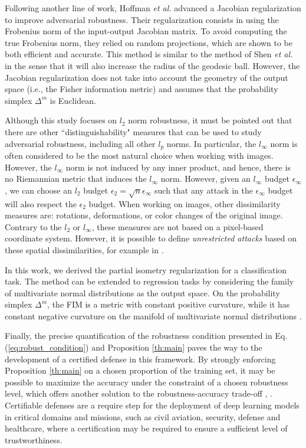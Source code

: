 \documentclass[entropy,article,submit,pdftex,moreauthors]{Definitions/mdpi}
\theoremstyle{plain}
\theoremstyle{definition}
\begin{document}
Following another line of work, Hoffman \emph{et al.} \citep{hoffmanRobustLearningJacobian2019} advanced a Jacobian regularization to improve adversarial robustness. Their regularization consists in using the Frobenius norm of the input-output Jacobian matrix. To avoid computing the true Frobenius norm, they relied on random projections, which are shown to be both efficient and accurate. This method is similar to the method of Shen \emph{et al.} \citep{shenDefendingAdversarialAttacks2019} in the sense that it will also increase the radius of the geodesic ball. However, the Jacobian regularization does not take into account the geometry of the output space (i.e., the Fisher information metric) and assumes that the probability simplex $\Delta^m$ is Euclidean.

Although this study focuses on $l_2$ norm robustness, it must be pointed out that there are other ``distinguishability" measures that can be used to study adversarial robustness, including all other $l_p$ norms. In particular, the $l_\infty$ norm is often considered to be the most natural choice when working with images. However, the $l_\infty$ norm is not induced by any inner product, and hence, there is no Riemannian metric that induces the $l_\infty$ norm. However, given an $l_\infty$ budget $\epsilon_\infty$, we can choose an $l_2$ budget $\epsilon_2 = \sqrt{n} \epsilon_\infty$ such that any attack in the $\epsilon_\infty$ budget will also respect the $\epsilon_2$ budget. When working on images, other dissimilarity measures are: rotations, deformations, or color changes of the original image. Contrary to the $l_2$ or $l_\infty$, these measures are not based on a pixel-based coordinate system. However, it is possible to define \emph{unrestricted attacks} based on these spatial dissimilarities, for example in \citep{xiao2018spatially}. 

In this work, we derived the partial isometry regularization for a classification task. The method can be extended to regression tasks by considering the family of multivariate normal distributions as the output space. On the probability simplex $\Delta^m$, the FIM is a metric with constant positive curvature, while it has constant negative curvature on the manifold of multivariate normal distributions \citep{skovgaardRiemannianGeometryMultivariate1984}.

Finally, the precise quantification of the robustness condition presented in Eq. (\ref{eq:robust_condition}) and Proposition \ref{th:main} paves the way to the development of a certified defense \citep{cohenCertifiedAdversarialRobustness2019} in this framework. By strongly enforcing Proposition \ref{th:main} on a chosen proportion of the training set, it may be possible to maximize the accuracy under the constraint of a chosen robustness level, which offers another solution to the robustness-accuracy trade-off \citep{pmlr-v97-zhang19p}, \citep{tsipras2018robustness}. Certifiable defenses are a require step for the deployment of deep learning models in critical domains and missions, such as civil aviation, security, defense and healthcare, where a certification may be required to ensure a sufficient level of trustworthiness.
\end{document}

